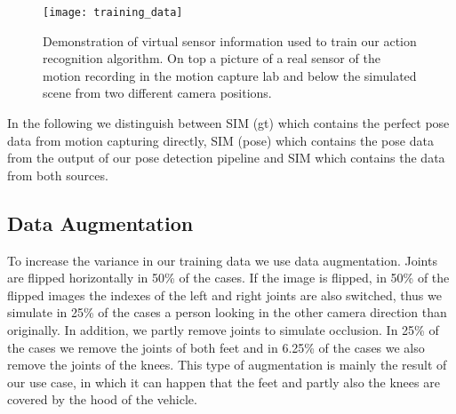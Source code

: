 \documentclass[a4paper, 10pt, conference]{ieeeconf}
\begin{document}
\begin{figure}
  \centering
  \texttt{[image: training\_data]}
  \caption{Demonstration of virtual sensor information used to train our action recognition algorithm. On top a picture of a real sensor of the motion recording in the motion capture lab and below the simulated scene from two different camera positions.}
  \label{fig:training_data}
\end{figure}

In the following we distinguish between SIM (gt) which contains the perfect pose data from motion capturing directly, SIM (pose) which contains the pose data from the output of our pose detection pipeline and SIM which contains the data from both sources.

\subsection{Data Augmentation}
To increase the variance in our training data we use data augmentation. Joints are flipped horizontally in 50\% of the cases. If the image is flipped, in 50\% of the flipped images the indexes of the left and right joints are also switched, thus we simulate in 25\% of the cases a person looking in the other camera direction than originally. In addition, we partly remove joints to simulate occlusion. In 25\% of the cases we remove the joints of both feet and in 6.25\% of the cases we also remove the joints of the knees. This type of augmentation is mainly the result of our use case, in which it can happen that the feet and partly also the knees are covered by the hood of the vehicle.
\end{document}
